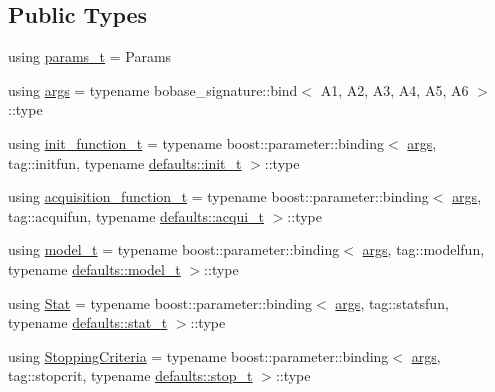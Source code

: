 \subsection*{Public Types}
\begin{DoxyCompactItemize}
\item 
using \hyperlink{classlimbo_1_1bayes__opt_1_1_bo_base_ad64c1fe61c97f4540914018439f96a0a}{params\+\_\+t} = Params
\item 
using \hyperlink{classlimbo_1_1bayes__opt_1_1_bo_base_a800d7d9dec5ac0c12b93150f12db9be3}{args} = typename bobase\+\_\+signature\+::bind$<$ A1, A2, A3, A4, A5, A6 $>$\+::type
\item 
using \hyperlink{classlimbo_1_1bayes__opt_1_1_bo_base_a0cd0e388e42c62bc38e02c096d8ae245}{init\+\_\+function\+\_\+t} = typename boost\+::parameter\+::binding$<$ \hyperlink{classlimbo_1_1bayes__opt_1_1_bo_base_a800d7d9dec5ac0c12b93150f12db9be3}{args}, tag\+::initfun, typename \hyperlink{structlimbo_1_1bayes__opt_1_1_bo_base_1_1defaults_afab889d523b8c28d1161079a5a453f79}{defaults\+::init\+\_\+t} $>$\+::type
\item 
using \hyperlink{classlimbo_1_1bayes__opt_1_1_bo_base_a5abe502b49e1ee70d5e00f27f95f5dff}{acquisition\+\_\+function\+\_\+t} = typename boost\+::parameter\+::binding$<$ \hyperlink{classlimbo_1_1bayes__opt_1_1_bo_base_a800d7d9dec5ac0c12b93150f12db9be3}{args}, tag\+::acquifun, typename \hyperlink{structlimbo_1_1bayes__opt_1_1_bo_base_1_1defaults_a7728ece1763ffbcac4e37f219047dcb1}{defaults\+::acqui\+\_\+t} $>$\+::type
\item 
using \hyperlink{classlimbo_1_1bayes__opt_1_1_bo_base_a5e23d523dd2a16b866a2660721b937bb}{model\+\_\+t} = typename boost\+::parameter\+::binding$<$ \hyperlink{classlimbo_1_1bayes__opt_1_1_bo_base_a800d7d9dec5ac0c12b93150f12db9be3}{args}, tag\+::modelfun, typename \hyperlink{structlimbo_1_1bayes__opt_1_1_bo_base_1_1defaults_aa9a30c408b869fd46861b028b6325b4a}{defaults\+::model\+\_\+t} $>$\+::type
\item 
using \hyperlink{classlimbo_1_1bayes__opt_1_1_bo_base_a4dfe2a37a52a4a964bce83cc580bff2e}{Stat} = typename boost\+::parameter\+::binding$<$ \hyperlink{classlimbo_1_1bayes__opt_1_1_bo_base_a800d7d9dec5ac0c12b93150f12db9be3}{args}, tag\+::statsfun, typename \hyperlink{structlimbo_1_1bayes__opt_1_1_bo_base_1_1defaults_a3c475362a937e011e02c715e8edbf2d1}{defaults\+::stat\+\_\+t} $>$\+::type
\item 
using \hyperlink{classlimbo_1_1bayes__opt_1_1_bo_base_a313e0d0d1eeceb3d090fbc2aafcc1984}{Stopping\+Criteria} = typename boost\+::parameter\+::binding$<$ \hyperlink{classlimbo_1_1bayes__opt_1_1_bo_base_a800d7d9dec5ac0c12b93150f12db9be3}{args}, tag\+::stopcrit, typename \hyperlink{structlimbo_1_1bayes__opt_1_1_bo_base_1_1defaults_aabb9a88029b7b3cba6d1bafe3dfadaf5}{defaults\+::stop\+\_\+t} $>$\+::type

\end{DoxyCompactItemize}
